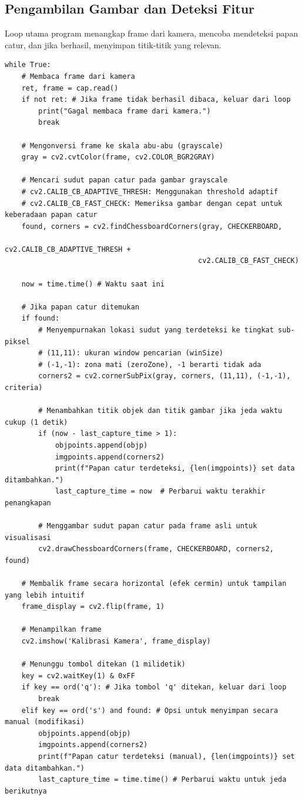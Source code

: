 \documentclass[12pt,a4paper]{article}
\begin{document}
\subsection{Pengambilan Gambar dan Deteksi Fitur}
Loop utama program menangkap frame dari kamera, mencoba mendeteksi papan catur,
dan jika berhasil, menyimpan titik-titik yang relevan.

\begin{lstlisting}[caption=Loop Utama: Pengambilan Gambar dan Deteksi Papan Catur, label=lst:loop]
while True:
    # Membaca frame dari kamera
    ret, frame = cap.read()
    if not ret: # Jika frame tidak berhasil dibaca, keluar dari loop
        print("Gagal membaca frame dari kamera.")
        break

    # Mengonversi frame ke skala abu-abu (grayscale)
    gray = cv2.cvtColor(frame, cv2.COLOR_BGR2GRAY)

    # Mencari sudut papan catur pada gambar grayscale
    # cv2.CALIB_CB_ADAPTIVE_THRESH: Menggunakan threshold adaptif
    # cv2.CALIB_CB_FAST_CHECK: Memeriksa gambar dengan cepat untuk keberadaan papan catur
    found, corners = cv2.findChessboardCorners(gray, CHECKERBOARD, 
                                              cv2.CALIB_CB_ADAPTIVE_THRESH + 
                                              cv2.CALIB_CB_FAST_CHECK)

    now = time.time() # Waktu saat ini

    # Jika papan catur ditemukan
    if found:  
        # Menyempurnakan lokasi sudut yang terdeteksi ke tingkat sub-piksel
        # (11,11): ukuran window pencarian (winSize)
        # (-1,-1): zona mati (zeroZone), -1 berarti tidak ada
        corners2 = cv2.cornerSubPix(gray, corners, (11,11), (-1,-1), criteria)
        
        # Menambahkan titik objek dan titik gambar jika jeda waktu cukup (1 detik)
        if (now - last_capture_time > 1):
            objpoints.append(objp)
            imgpoints.append(corners2)
            print(f"Papan catur terdeteksi, {len(imgpoints)} set data ditambahkan.")
            last_capture_time = now  # Perbarui waktu terakhir penangkapan

        # Menggambar sudut papan catur pada frame asli untuk visualisasi
        cv2.drawChessboardCorners(frame, CHECKERBOARD, corners2, found)
    
    # Membalik frame secara horizontal (efek cermin) untuk tampilan yang lebih intuitif
    frame_display = cv2.flip(frame, 1)

    # Menampilkan frame
    cv2.imshow('Kalibrasi Kamera', frame_display)
    
    # Menunggu tombol ditekan (1 milidetik)
    key = cv2.waitKey(1) & 0xFF
    if key == ord('q'): # Jika tombol 'q' ditekan, keluar dari loop
        break
    elif key == ord('s') and found: # Opsi untuk menyimpan secara manual (modifikasi)
        objpoints.append(objp)
        imgpoints.append(corners2)
        print(f"Papan catur terdeteksi (manual), {len(imgpoints)} set data ditambahkan.")
        last_capture_time = time.time() # Perbarui waktu untuk jeda berikutnya
\end{lstlisting}
\end{document}
